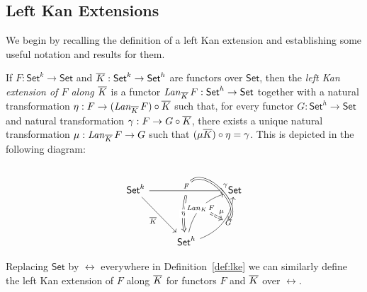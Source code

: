 \documentclass{lmcs}
\theoremstyle{plain}\newtheorem{satz}[thm]{Satz}
\newcommand{\set}{\mathsf{Set}}
\begin{document}
\subsection{Left Kan Extensions}\label{sec:lke}

We begin by recalling the definition of a left Kan extension and
establishing some useful notation and results for them.

\begin{defi}\label{def:lke}
If $F : \set^k \to \set$ and $\ol{K} : \set^k \to \set^h$ are functors
over $\set$, then the {\em left Kan extension of $F$ along $\overline{K}$} is
a functor $\mathit{Lan}_{\ol K}\,F : \set^h \to \set$ together with a
natural transformation $\eta : F \to (\mathit{Lan}_{\overline{K}}\,F)
\circ \overline{K}$
such that, for every functor $G : \set^h \to \set$ and natural
transformation $\gamma : F \to G \circ \overline{K}$, there exists a unique
natural transformation $\mu : \mathit{Lan}_{\overline{K}}\,F \to G$ such that
$(\mu {\overline{K}}) \circ \eta = \gamma$. This is depicted in the
following diagram:

\vspace*{-0.15in}

\[
\begin{tikzcd}[row sep = huge]
\set^k
\ar[rr, "{F}"{name=Fa}, ""{name=F, below}]
\ar[rd, "{\ol K}"']
&& \set \\
& \set^h
\ar[Rightarrow, bend right = 10, from=F, "{\eta}" description]
\ar[ur, bend left, "{\mathit{Lan}_K\,F}"{name=Lan, description}]
\ar[ur, bend right, "{G}"'{name=L, right}, ""'{name=Lr, right}]
\ar[Rightarrow, bend left = 90, from=Fa, to=Lr, "{\gamma}"]
\ar[Rightarrow, dashed, from=Lan, to=L, "{\mu}"]
\end{tikzcd}
\]

\vspace*{0.05in}

\noindent
Replacing $\set$ by $\rel$ everywhere in Definition~\ref{def:lke} we
can similarly define the left Kan extension of $F$ along $\overline{K}$ for
functors $F$ and $\overline{K}$ over $\rel$.
\end{defi}
\end{document}
